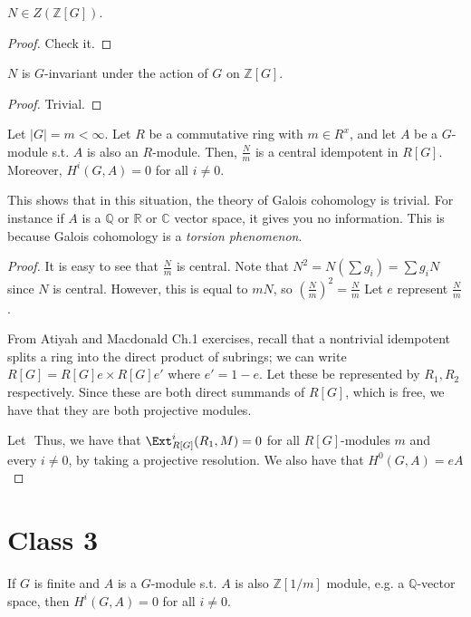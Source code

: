\documentclass[12pt]{scrartcl}
\newcounter{exercises}[section]
\begin{document}
	\begin{proposition}
		$N \in Z(\mathbb{Z}[G])$. 
	\end{proposition}
	\begin{proof}
	Check it.
	\end{proof}
	\begin{proposition}
		$N$ is $G$-invariant under the action of $G$ on $\mathbb{Z}[G]$. 
	\end{proposition}
	\begin{proof}
	Trivial.
	\end{proof}

	\begin{theorem}
	Let $|G| = m < \infty$.
	Let $R$ be a commutative ring with $m \in R^x$, and let $A$ be a $G$-module s.t. $A$ is also an $R$-module.
	Then, $\frac{N}{m}$ is a central idempotent in $R[G]$.
	Moreover, $H^i(G, A) = 0$ for all $i \neq 0$.  
	\end{theorem}
	This shows that in this situation, the theory of Galois cohomology is trivial.
	For instance if $A$ is a $\mathbb{Q}$ or $\mathbb{R}$ or $\mathbb{C}$ vector space, it gives you no information.
	This is because Galois cohomology is a \emph{torsion phenomenon}.
	\begin{proof}
	It is easy to see that $\frac{N}{m} $ is central.
	Note that $N^2 = N \left(\sum g_i\right) = \sum g_i N$ since $N$ is central.
	However, this is equal to $mN$, so $\left(\frac{N}{m}\right)^2 = \frac{N}{m}$
	Let $e$ represent $\frac{N}{m}$.

	From Atiyah and Macdonald Ch.1 exercises, recall that a nontrivial idempotent splits a ring into the direct product of subrings; we can write $R[G] = R[G]e \times R[G]e'$ where $e' = 1-e$.
	Let these be represented by $R_1, R_2$ respectively.
	Since these are both direct summands of $R[G]$, which is free, we have that they are both projective modules.


	Let $ $ 
	Thus, we have that $\Ext_{R[G]}^i(R_1, M) = 0$ for all $R[G]$-modules $m$ and every $i\neq 0$, by taking a projective resolution.
		We also have that $H^0(G, A) = eA$ 
	\end{proof}
	
	\section{Class 3}
	\begin{corollary}
		If $G$ is finite and $A$ is a $G$-module s.t. $A$ is also $\mathbb{Z}[1/m]$ module, e.g. a $\mathbb{Q}$-vector space, then $H^i(G, A) = 0$ for all $i \neq 0$.     
	\end{corollary}
	
\end{document}
